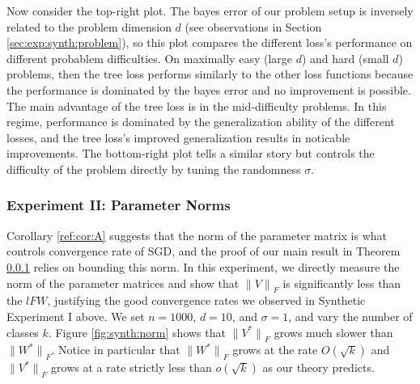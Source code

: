 \documentclass[twoside]{article}
\renewcommand{\star}[1]{{#1}^{*}}
\newcommand{\lF}[1]{{\lVert {#1} \rVert}_F}
\newcommand{\ignore}[1]{}
\begin{document}
Now consider the top-right plot.
The bayes error of our problem setup is inversely related to the problem dimension $d$ (see observations in Section \ref{sec:exp:synth:problem}),
so this plot compares the different loss's performance on different probablem difficulties.
On maximally easy (large $d$) and hard (small $d$) problems,
then the tree loss performs similarly to the other loss functions because the performance is dominated by the bayes error and no improvement is possible.
The main advantage of the tree loss is in the mid-difficulty problems.
In this regime, performance is dominated by the generalization ability of the different losses,
and the tree loss's improved generalization results in noticable improvements.
The bottom-right plot tells a similar story but controls the difficulty of the problem directly by tuning the randomness $\sigma$.

\ignore{
From figure \ref{fig.1}, it is clear that the tree loss achieves the best performance. 
The tree loss converges at a faster rate as number of data points and dimension of parameter matrix increase.
If we increase the number of classes, the tree loss can keep a higher accuracy and the accuracy of SimLoss is higher than cross entropy loss and hierarchical softmax.
It is as our expected, the tree loss can improve performance on large classes tasks.
Besides, when we increase the noise in the dataset, the accuracy of all loss functions decrease, yet the tree loss decreases slower.
Among the four loss functions, hierarchical softmax hurts the performance obviously. 
We would not apply hierarchical softmax on real world data experiment in terms of computation.
}

\subsubsection{Experiment II: Parameter Norms}

Corollary \ref{ref:cor:A} suggests that the norm of the parameter matrix is what controls convergence rate of SGD,
and the proof of our main result in Theorem \ref{} relies on bounding this norm.
In this experiment, we directly measure the norm of the parameter matrices and show that $\lF{V}$ is significantly less than the $lF{W}$,
justifying the good convergence rates we observed in Synthetic Experiment I above.
We set $n=1000$, $d=10$, and $\sigma=1$, and vary the number of classes $k$.
Figure \ref{fig:synth:norm} shows that $\lF{\star V}$ grows much slower than $\lF{\star W}$.
Notice in particular that $\lF{\star W}$ grows at the rate $O(\sqrt{k})$ and $\lF{\star V}$ grows at a rate strictly less than $o(\sqrt{k})$ as our theory predicts.
\end{document}
